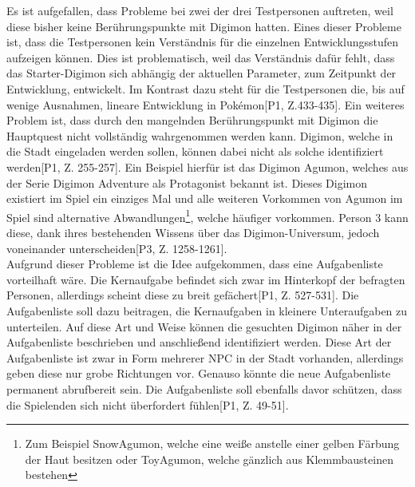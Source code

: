 Es ist aufgefallen, dass Probleme bei zwei der drei Testpersonen auftreten, weil diese bisher keine Berührungspunkte mit Digimon hatten. Eines dieser Probleme ist, dass die Testpersonen kein Verständnis für die einzelnen Entwicklungsstufen aufzeigen können. Dies ist problematisch, weil das Verständnis dafür fehlt, dass das Starter-Digimon sich abhängig der aktuellen Parameter, zum Zeitpunkt der Entwicklung, entwickelt. Im Kontrast dazu steht für die Testpersonen die, bis auf wenige Ausnahmen, lineare Entwicklung in Pokémon[P1, Z.433-435]. Ein weiteres Problem ist, dass durch den mangelnden Berührungspunkt mit Digimon die Hauptquest nicht vollständig wahrgenommen werden kann. Digimon, welche in die Stadt eingeladen werden sollen, können dabei nicht als solche identifiziert werden[P1, Z. 255-257]. Ein Beispiel hierfür ist das Digimon Agumon, welches aus der Serie Digimon Adventure als Protagonist bekannt ist. Dieses Digimon existiert im Spiel ein einziges Mal und alle weiteren Vorkommen von Agumon im Spiel sind alternative Abwandlungen\footnote{Zum Beispiel SnowAgumon, welche eine weiße anstelle einer gelben Färbung der Haut besitzen oder ToyAgumon, welche gänzlich aus Klemmbausteinen bestehen}, welche häufiger vorkommen. Person 3 kann diese, dank ihres bestehenden Wissens über das Digimon-Universum, jedoch voneinander unterscheiden[P3, Z. 1258-1261].\\

Aufgrund dieser Probleme ist die Idee aufgekommen, dass eine Aufgabenliste vorteilhaft wäre\hypothesis[P1, Z. 533]. Die Kernaufgabe befindet sich zwar im Hinterkopf der befragten Personen, allerdings scheint diese zu breit gefächert[P1, Z. 527-531]. Die Aufgabenliste soll dazu beitragen, die Kernaufgaben in kleinere Unteraufgaben zu unterteilen. Auf diese Art und Weise können die gesuchten Digimon näher in der Aufgabenliste beschrieben und anschließend identifiziert werden. Diese Art der Aufgabenliste ist zwar in Form mehrerer \ac{NPC} in der Stadt vorhanden, allerdings geben diese nur grobe Richtungen vor. Genauso könnte die neue Aufgabenliste permanent abrufbereit sein. Die Aufgabenliste soll ebenfalls davor schützen, dass die Spielenden sich nicht überfordert fühlen[P1, Z. 49-51].\\

